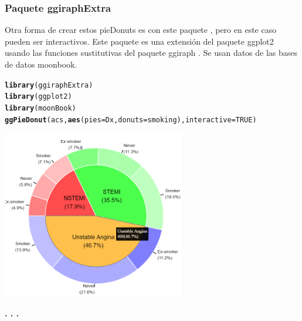 \documentclass{article}\usepackage[]{graphicx}\usepackage[]{color}
\makeatletter
\newcommand{\hlnum}[1]{\textcolor[rgb]{0.686,0.059,0.569}{#1}}%
\newcommand{\hlstd}[1]{\textcolor[rgb]{0.345,0.345,0.345}{#1}}%
\newcommand{\hlkwc}[1]{\textcolor[rgb]{0.333,0.667,0.333}{#1}}%
\newcommand{\hlkwd}[1]{\textcolor[rgb]{0.737,0.353,0.396}{\textbf{#1}}}%
\newenvironment{kframe}{%
 \def\at@end@of@kframe{}%
 \ifinner\ifhmode%
  \def\at@end@of@kframe{\end{minipage}}%
  \begin{minipage}{\columnwidth}%
 \fi\fi%
 \def\FrameCommand##1{\hskip\@totalleftmargin \hskip-\fboxsep
 \colorbox{shadecolor}{##1}\hskip-\fboxsep
     \hskip-\linewidth \hskip-\@totalleftmargin \hskip\columnwidth}%
 \MakeFramed {\advance\hsize-\width
   \@totalleftmargin\z@ \linewidth\hsize
   \@setminipage}}%
 {\par\unskip\endMakeFramed%
 \at@end@of@kframe}
\newenvironment{knitrout}{}{} %
\makeatother
\begin{document}
\subsubsection{Paquete ggiraphExtra}
Otra forma de crear estos pieDonuts es con este paquete \cite{docu_ggiraphExtra}
, pero en este caso pueden ser interactivos. Este paquete es una extensi\'on del paquete ggplot2 \cite{docu_ggplot2}
usando las funciones sustitutivas del paquete ggiraph \cite{docu_ggiraph}
.
Se usan datos de las bases de datos moonbook.
\begin{knitrout}
\color{fgcolor}\begin{kframe}
\begin{alltt}
\hlkwd{library}\hlstd{(ggiraphExtra)}
\hlkwd{library}\hlstd{(ggplot2)}
\hlkwd{library}\hlstd{(moonBook)}
\hlkwd{ggPieDonut}\hlstd{(acs,}\hlkwd{aes}\hlstd{(}\hlkwc{pies}\hlstd{=Dx,}\hlkwc{donuts}\hlstd{=smoking),} \hlkwc{interactive} \hlstd{=} \hlnum{TRUE}\hlstd{)}
\end{alltt}
\end{kframe}
\end{knitrout}
\vbox{
    \centering
    \includegraphics[width=0.6\textwidth]{imag/pieDonut_inte}
}
\begin{center}
\textbf{. . .}
\end{center}
\end{document}
